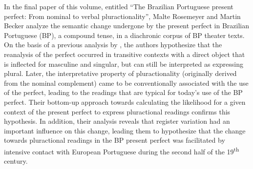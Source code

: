 \documentclass[output=paper,colorlinks,citecolor=brown]{langscibook}
\begin{document}
In the final paper of this volume, entitled “The Brazilian Portuguese present perfect: From nominal to verbal pluractionality”, Malte Rosemeyer and Martin Becker analyze the semantic change undergone by the present perfect in Brazilian Portuguese (BP), a compound tense, in a diachronic corpus of BP theater texts. On the basis of a previous analysis by \citet{AmaralHowe2012}, the authors hypothesize that the reanalysis of the perfect occurred in transitive contexts with a direct object that is inflected for masculine and singular, but can still be interpreted as expressing plural. Later, the interpretative property of pluractionality (originally derived from the nominal complement) came to be conventionally associated with the use of the perfect, leading to the readings that are typical for today’s use of the BP perfect. Their bottom-up approach towards calculating the likelihood for a given context of the present perfect to express pluractional readings confirms this hypothesis. In addition, their analysis reveals that register variation had an important influence on this change, leading them to hypothesize that the change towards pluractional readings in the BP present perfect was facilitated by intensive contact with European Portuguese during the second half of the 19\textsuperscript{th} century.

{\sloppy\printbibliography[heading=subbibliography,notkeyword=this]}
\end{document}
